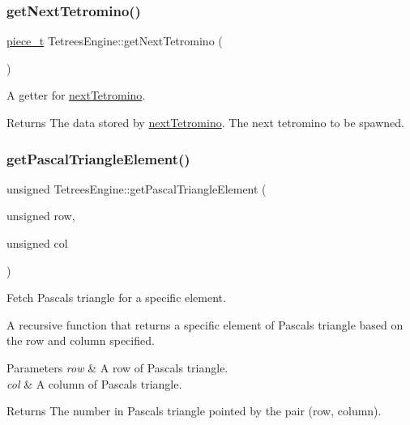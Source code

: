 \subsubsection{\texorpdfstring{get\+Next\+Tetromino()}{getNextTetromino()}}
{\footnotesize\ttfamily \mbox{\hyperlink{structpiece__t}{piece\+\_\+t}} Tetrees\+Engine\+::get\+Next\+Tetromino (\begin{DoxyParamCaption}{ }\end{DoxyParamCaption})}

A getter for \mbox{\hyperlink{classTetreesEngine_a44c902481f5d8a72ca8a78d24f5c3a33}{next\+Tetromino}}. \begin{DoxyReturn}{Returns}
The data stored by \mbox{\hyperlink{classTetreesEngine_a44c902481f5d8a72ca8a78d24f5c3a33}{next\+Tetromino}}. The next tetromino to be spawned. 
\end{DoxyReturn}
\mbox{\label{classTetreesEngine_a087f12761b955478bff1d4e70e6c0549}} 
\subsubsection{\texorpdfstring{get\+Pascal\+Triangle\+Element()}{getPascalTriangleElement()}}
{\footnotesize\ttfamily unsigned Tetrees\+Engine\+::get\+Pascal\+Triangle\+Element (\begin{DoxyParamCaption}\item[{unsigned}]{row,  }\item[{unsigned}]{col }\end{DoxyParamCaption})\hspace{0.3cm}{\ttfamily [private]}}



Fetch Pascal\textquotesingle{}s triangle for a specific element. 

A recursive function that returns a specific element of Pascal\textquotesingle{}s triangle based on the row and column specified. 
\begin{DoxyParams}{Parameters}
{\em row} & A row of Pascal\textquotesingle{}s triangle. \\
\hline
{\em col} & A column of Pascal\textquotesingle{}s triangle. \\
\hline
\end{DoxyParams}
\begin{DoxyReturn}{Returns}
The number in Pascal\textquotesingle{}s triangle pointed by the pair (row, column). 
\end{DoxyReturn}
\mbox{\label{classTetreesEngine_a1f167b42fc077d496449a2cc959989ac}} 
